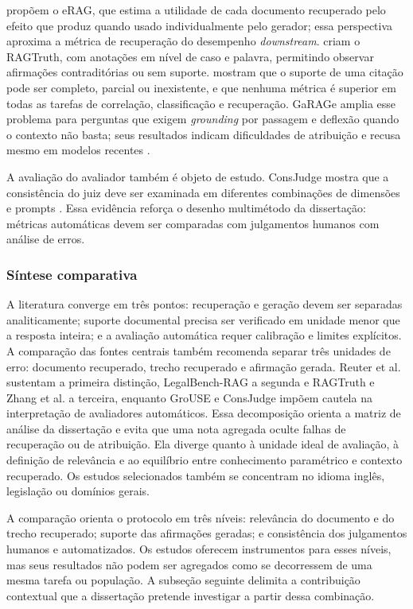 \textcite{salemiZamani2024erag} propõem o eRAG, que estima a utilidade de cada documento recuperado pelo efeito que produz quando usado individualmente pelo gerador; essa perspectiva aproxima a métrica de recuperação do desempenho \textit{downstream}. \textcite{niuEtAl2024ragtruth} criam o RAGTruth, com anotações em nível de caso e palavra, permitindo observar afirmações contraditórias ou sem suporte. \textcite{zhangEtAl2024fineGrainedCitation} mostram que o suporte de uma citação pode ser completo, parcial ou inexistente, e que nenhuma métrica é superior em todas as tarefas de correlação, classificação e recuperação. GaRAGe amplia esse problema para perguntas que exigem \textit{grounding} por passagem e deflexão quando o contexto não basta; seus resultados indicam dificuldades de atribuição e recusa mesmo em modelos recentes \parencite{sorodocEtAl2025garage}.

A avaliação do avaliador também é objeto de estudo. ConsJudge mostra que a consistência do juiz deve ser examinada em diferentes combinações de dimensões e prompts \parencite{liuEtAl2025judgeRag}. Essa evidência reforça o desenho multimétodo da dissertação: métricas automáticas devem ser comparadas com julgamentos humanos com análise de erros.

\subsubsection{Síntese comparativa}

A literatura converge em três pontos: recuperação e geração devem ser separadas analiticamente; suporte documental precisa ser verificado em unidade menor que a resposta inteira; e a avaliação automática requer calibração e limites explícitos. A comparação das fontes centrais também recomenda separar três unidades de erro: documento recuperado, trecho recuperado e afirmação gerada. Reuter et al. sustentam a primeira distinção, LegalBench-RAG a segunda e RAGTruth e Zhang et al. a terceira, enquanto GroUSE e ConsJudge impõem cautela na interpretação de avaliadores automáticos. Essa decomposição orienta a matriz de análise da dissertação e evita que uma nota agregada oculte falhas de recuperação ou de atribuição. Ela diverge quanto à unidade ideal de avaliação, à definição de relevância e ao equilíbrio entre conhecimento paramétrico e contexto recuperado. Os estudos selecionados também se concentram no idioma inglês, legislação ou domínios gerais.

A comparação orienta o protocolo em três níveis: relevância do documento e do trecho recuperado; suporte das afirmações geradas; e consistência dos julgamentos humanos e automatizados. Os estudos oferecem instrumentos para esses níveis, mas seus resultados não podem ser agregados como se decorressem de uma mesma tarefa ou população. A subseção seguinte delimita a contribuição contextual que a dissertação pretende investigar a partir dessa combinação.

